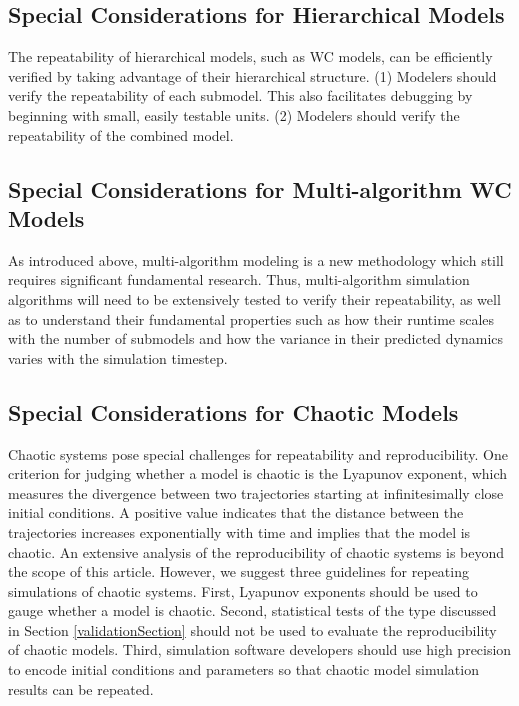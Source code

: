 \documentclass[journal,transmag,twoside]{IEEEtran}
\begin{document}
\subsection{Special Considerations for Hierarchical Models}
The repeatability of hierarchical models, such as WC models, can be efficiently verified by taking advantage of their hierarchical structure. (1) Modelers should verify the repeatability of each submodel. This also facilitates debugging by beginning with small, easily testable units. (2) Modelers should verify the repeatability of the combined model.

\subsection{Special Considerations for Multi-algorithm WC Models}
As introduced above, multi-algorithm modeling is a new methodology which still requires significant fundamental research. Thus, multi-algorithm simulation algorithms will need to be extensively tested to verify their repeatability, as well as to understand their fundamental properties such as how their runtime scales with the number of submodels and how the variance in their predicted dynamics varies with the simulation timestep.

\subsection{Special Considerations for Chaotic Models}

Chaotic systems pose special challenges for repeatability and reproducibility. One criterion for judging whether a model is chaotic is the Lyapunov exponent, which measures the divergence between two trajectories starting at infinitesimally close initial conditions. A positive value indicates that the distance between the trajectories increases exponentially with time and implies that the model is chaotic. An extensive analysis of the reproducibility of chaotic systems is beyond the scope of this article. However, we suggest three guidelines for repeating simulations of chaotic systems. First, Lyapunov exponents should be used to gauge whether a model is chaotic. Second, statistical tests of the type discussed in Section \ref{validationSection} should not be used to evaluate the reproducibility of chaotic models. Third, simulation software developers should use high precision to encode initial conditions and parameters so that chaotic model simulation results can be repeated.
\end{document}
